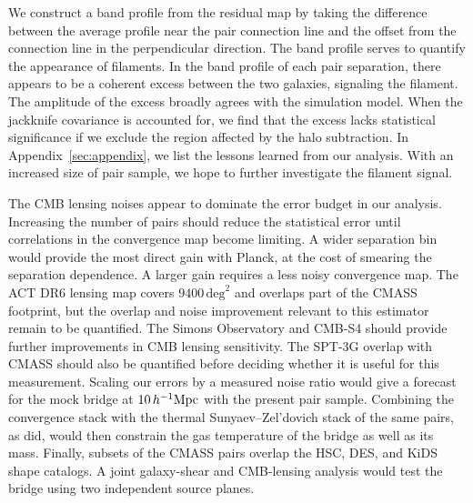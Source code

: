 \documentclass[preprint]{aastex701}
\newcommand{\hinvMpc}{h^{-1}{\rm Mpc}}
\begin{document}
We construct a band profile from the residual map by taking the difference between the average profile near the pair connection line and the offset from the connection line in the perpendicular direction. The band profile serves to quantify the appearance of filaments. In the band profile of each pair separation, there appears to be a coherent excess between the two galaxies, signaling the filament. The amplitude of the excess broadly agrees with the simulation model. When the jackknife covariance is accounted for, we find that the excess lacks statistical significance if we exclude the region affected by the halo subtraction. In Appendix~\ref{sec:appendix}, we list the lessons learned from our analysis. With an increased size of pair sample, we hope to further investigate the filament signal.

The CMB lensing noises appear to dominate the error budget in our analysis.
Increasing the number of pairs
should reduce the statistical error until correlations in the convergence
map become limiting. A wider separation bin would provide the most direct
gain with Planck, at the cost of smearing the separation dependence. A larger
gain requires a less noisy convergence map. The ACT DR6 lensing map covers
$9400\,\mathrm{deg}^{2}$ and overlaps part of the CMASS footprint, but the
overlap and noise improvement relevant to this estimator remain to be
quantified. %
The Simons Observatory and CMB-S4 should provide further improvements in CMB
lensing sensitivity. %
The SPT-3G overlap with CMASS should also be quantified before deciding
whether it is useful for this measurement. Scaling our errors by a measured
noise ratio would give a forecast for the mock bridge at $10\,\hinvMpc$ with
the present pair sample. %
Combining the convergence stack with the
thermal Sunyaev--Zel'dovich stack of the same pairs, as \citet{deGraaff2019}
did, would then constrain the gas temperature of the bridge as well as its
mass. Finally, subsets of the CMASS pairs overlap the HSC, DES, and KiDS shape
catalogs. A joint galaxy-shear and CMB-lensing analysis would test the bridge
using two independent source planes. %
\end{document}
